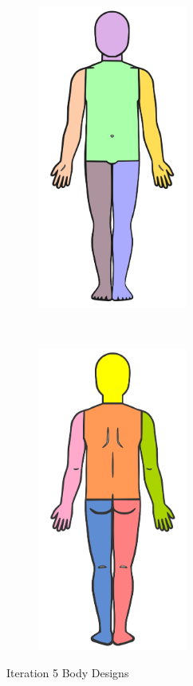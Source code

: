 \clearpage
\begin{figure}[t!]
    \centering
    \begin{subfigure}[t]{0.5\textwidth}
        \centering
        \includegraphics[height=10cm]{figures/bodydesign5front.png}
    \end{subfigure}%
    ~
    \begin{subfigure}[t]{0.5\textwidth}
        \centering
        \includegraphics[height=10cm]{figures/bodydesign5back.png}
    \end{subfigure}
    \caption{Iteration 5 Body Designs}
    \label{fig:it15design}
\end{figure}




